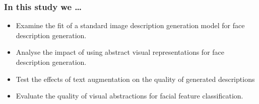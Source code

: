 \documentclass[aspectratio=1610]{beamer} %
\begin{document}
\begin{frame}
\frametitle{In this study we \ldots}
\begin{itemize}
	\item Examine the fit of a standard image description generation model for face description generation.
	\pause
	\item Analyse the impact of using abstract visual representations for face description generation.
	\pause
	\item Test the effects of text augmentation on the quality of generated descriptions
	\pause
	\item Evaluate the quality of visual abstractions for facial feature classification.
\end{itemize}
\end{frame}
\end{document}
